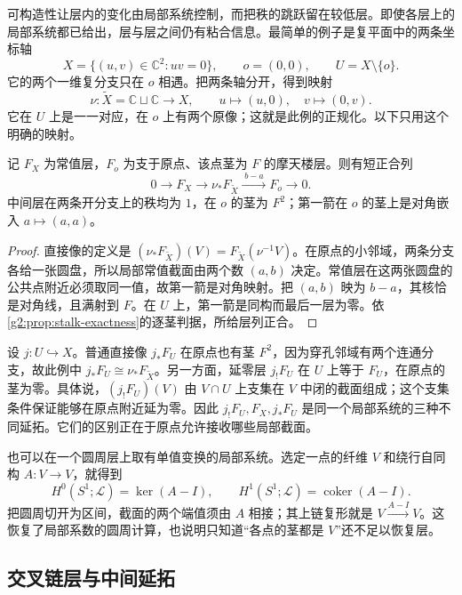 可构造性让层内的变化由局部系统控制，而把秩的跳跃留在较低层。即使各层上的局部系统都已给出，层与层之间仍有粘合信息。最简单的例子是复平面中的两条坐标轴
\[
	X=\{(u,v)\in\mathbb C^2:uv=0\},\qquad o=(0,0),\qquad U=X\setminus\{o\}.
\]
它的两个一维复分支只在 \(o\) 相遇。把两条轴分开，得到映射
\[
	\nu:\widetilde X=\mathbb C\sqcup\mathbb C\longrightarrow X,
	\qquad u\longmapsto(u,0),\quad v\longmapsto(0,v).
\]
它在 \(U\) 上是一一对应，在 \(o\) 上有两个原像；这就是此例的正规化。以下只用这个明确的映射。

\begin{proposition}\label{g2:prop:node-sheaf-sequence}
	记 \(F_X\) 为常值层，\(F_o\) 为支于原点、该点茎为 \(F\) 的摩天楼层。则有短正合列
	\begin{equation}\label{g2:eq:node-sheaf-sequence}
		0\longrightarrow F_X\longrightarrow\nu_*F_{\widetilde X}
		\xrightarrow{\;b-a\;}F_o\longrightarrow0.
	\end{equation}
	中间层在两条开分支上的秩均为 \(1\)，在 \(o\) 的茎为 \(F^2\)；第一箭在 \(o\) 的茎上是对角嵌入 \(a\mapsto(a,a)\)。
\end{proposition}
\begin{proof}
	直接像的定义是 \((\nu_*F_{\widetilde X})(V)=F_{\widetilde X}(\nu^{-1}V)\)。在原点的小邻域，两条分支各给一张圆盘，所以局部常值截面由两个数 \((a,b)\) 决定。常值层在这两张圆盘的公共点附近必须取同一值，故第一箭是对角映射。把 \((a,b)\) 映为 \(b-a\)，其核恰是对角线，且满射到 \(F\)。在 \(U\) 上，第一箭是同构而最后一层为零。依\cref{g2:prop:stalk-exactness}的逐茎判据，所给层列正合。
\end{proof}

设 \(j:U\hookrightarrow X\)。普通直接像 \(j_*F_U\) 在原点也有茎 \(F^2\)，因为穿孔邻域有两个连通分支，故此例中 \(j_*F_U\cong\nu_*F_{\widetilde X}\)。另一方面，延零层 \(j_!F_U\) 在 \(U\) 上等于 \(F_U\)，在原点的茎为零。具体说，\((j_!F_U)(V)\) 由 \(V\cap U\) 上支集在 \(V\) 中闭的截面组成；这个支集条件保证能够在原点附近延为零。因此 \(j_!F_U,F_X,j_*F_U\) 是同一个局部系统的三种不同延拓。它们的区别正在于原点允许接收哪些局部截面。

\ProseParagraphBreak

也可以在一个圆周层上取有单值变换的局部系统。选定一点的纤维 \(V\) 和绕行自同构 \(A:V\to V\)，就得到
\[
	H^0(S^1;\mathcal L)=\ker(A-I),\qquad
	H^1(S^1;\mathcal L)=\operatorname{coker}(A-I).
\]
把圆周切开为区间，截面的两个端值须由 \(A\) 相接；其上链复形就是 \(V\xrightarrow{A-I}V\)。这恢复了局部系数的圆周计算，也说明只知道“各点的茎都是 \(V\)”还不足以恢复层。

\subsection{交叉链层与中间延拓}
\label{g2:subsec:B04:02}

